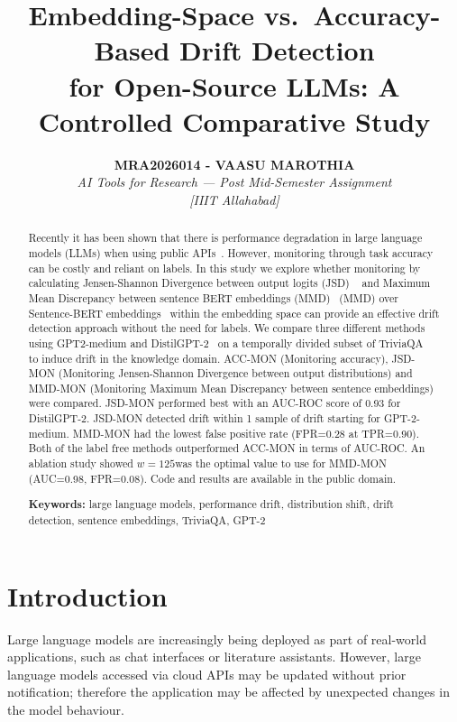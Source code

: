 \documentclass[12pt,a4paper]{article}
\title{\Large\textbf{Embedding-Space vs.\ Accuracy-Based Drift Detection\\
for Open-Source LLMs: A Controlled Comparative Study}}
\author{
  \textbf{MRA2026014 - VAASU MAROTHIA}\\[4pt]
  \textit{AI Tools for Research — Post Mid-Semester Assignment}\\
  \textit{[IIIT Allahabad]}
}
\date{}
\begin{document}
\maketitle
\thispagestyle{empty}

\begin{abstract}
Recently it has been shown that there is performance degradation in large language models (LLMs) when using public APIs~\cite{Chen2023,Ouyang2022}. However, monitoring through task accuracy can be costly and reliant on labels. In this study we explore whether monitoring by calculating Jensen-Shannon Divergence between output logits (JSD) ~\cite{Lin1991} and Maximum Mean Discrepancy between sentence BERT embeddings (MMD)~\cite{Gretton2012} (MMD) over Sentence-BERT
embeddings~\cite{Reimers2019} within the embedding space can provide an effective drift detection approach without the need for labels. We compare three different methods using GPT2-medium and DistilGPT-2~\cite{Radford2019,Sanh2019} on a temporally divided subset of TriviaQA~\cite{Joshi2017} to induce drift in the knowledge domain. ACC-MON (Monitoring accuracy), JSD-MON (Monitoring Jensen-Shannon Divergence between output distributions) and MMD-MON (Monitoring Maximum Mean Discrepancy between sentence embeddings) were compared. JSD-MON performed best with an AUC-ROC score of 0.93 for DistilGPT-2. JSD-MON detected drift within 1 sample of drift starting for GPT-2-medium. MMD-MON had the lowest false positive rate (FPR=0.28 at TPR=0.90). Both of the label free methods outperformed ACC-MON in terms of AUC-ROC. An ablation study showed $w\!=\!125$was the optimal value to use for MMD-MON (AUC=0.98, FPR=0.08). Code and results are available in the public domain.


\medskip\noindent\textbf{Keywords:} large language models, performance drift, distribution shift, drift detection, sentence embeddings, TriviaQA, GPT-2
\end{abstract}

\newpage
\newpage

\section{Introduction}
\label{sec:intro}


Large language models are increasingly being deployed as part of real-world applications, such as chat interfaces or literature assistants. However, large language models accessed via cloud APIs may be updated without prior notification; therefore the application may be affected by unexpected changes in the model behaviour.
\end{document}

